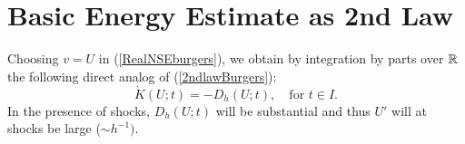 \section{Basic Energy Estimate as 2nd Law}

Choosing $v=U$ in (\ref{RealNSEburgers}), we obtain by 
integration by parts over ${\mathbb{R}}$ the following direct analog
of (\ref{2ndlawBurgers}):
\[
\dot K(U;t)=-D_h(U;t),\quad\mbox{for } t\in I.
\]
%
In the presence of shocks, $D_h(U; t)$ will be substantial
and thus $U'$ will at shocks be large ($\sim h^{-1})$.





